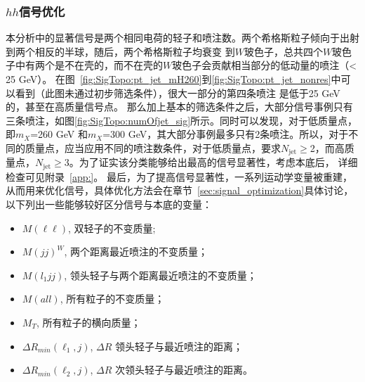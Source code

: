 \subsubsection{$hh$信号优化}\label{subsubsec:hh_optimization}
本分析中的显著信号是两个相同电荷的轻子和喷注数。两个希格斯粒子倾向于出射到两个相反的半球，随后，两个希格斯粒子均衰变
到$W$玻色子，总共四个$W$玻色子中有两个是不在壳的，而不在壳的$W$玻色子会贡献相当部分的低动量的喷注（\pt < 25 GeV）。
在图~\ref{fig:SigTopo:pt_jet_mH260}到\ref{fig:SigTopo:pt_jet_nonres}中可以看到（此图未通过初步筛选条件），很大一部分的第四条喷注 \pt 是低于25 GeV的，甚至在高质量信号点。
那么加上基本的筛选条件之后，大部分信号事例只有三条喷注，如图\ref{fig:SigTopo:numOfjet_sig}所示。同时可以发现，对于低质量点，即$m_X$=260 GeV 和$m_X$=300 GeV，其大部分事例最多只有2条喷注。所以，对于不同的质量点，应当应用不同的喷注数条件，对于低质量点，要求$N_\text{jet}\ge$2，而高质量点，$N_\text{jet}\ge$3。为了证实该分类能够给出最高的信号显著性，考虑本底后，
详细检查可见附录~\ref{app:}。
最后，为了提高信号显著性，一系列运动学变量被重建，从而用来优化信号，具体优化方法会在章节~\ref{sec:signal_optimization}具体讨论，
以下列出一些能够较好区分信号与本底的变量：
\begin{itemize}
 \item $M(\ell\ell)$, 双轻子的不变质量;
 \item $M(jj)^W$, 两个距离最近喷注的不变质量；%
 \item $M(l_1jj)$, 领头轻子与两个距离最近喷注的不变质量；%
 \item $M(all)$, 所有粒子的不变质量；%
 \item $M_T$, 所有粒子的横向质量；%
 \item $\Delta R_{min}(\ell_1, j)$, $\Delta R$ 领头轻子与最近喷注的距离；%
 \item $\Delta R_{min}(\ell_2, j)$, $\Delta R$ 次领头轻子与最近喷注的距离。%
\end{itemize}

